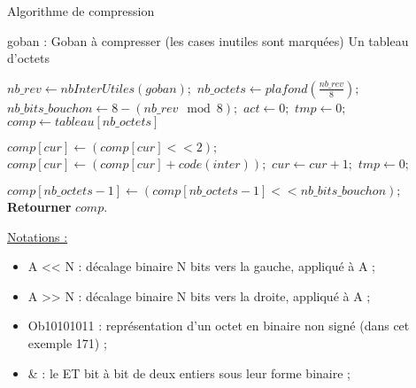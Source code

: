             \begin{algorithm}
                \caption{Algorithme de compression}
                \begin{algorithmic}
                \REQUIRE goban : Goban à compresser (les cases inutiles sont marquées)
                \ENSURE Un tableau d'octets
        
                \STATE $nb\_rev \leftarrow \textit{nbInterUtiles}(goban);$
                \STATE $nb\_octets \leftarrow \textit{plafond}(\frac{nb\_rev}{8});$
                \STATE $nb\_bits\_bouchon \leftarrow 8 - (nb\_rev \mod 8);$
                \STATE $act \leftarrow 0;$
                \STATE $tmp \leftarrow 0;$
                \STATE $comp \leftarrow \textit{tableau}[nb\_octets]$
                
                    \STATE $comp[cur] \leftarrow (comp[cur] << 2);$
                    \STATE $comp[cur] \leftarrow (comp[cur] + \textit{code}(inter));$
                        \STATE $cur \leftarrow cur + 1;$
                        \STATE $tmp \leftarrow 0;$
                    \ENDIF
                \ENDFOR
         
                \STATE $comp[nb\_octets - 1] \leftarrow (comp[nb\_octets - 1] << nb\_bits\_bouchon);$
                \STATE \textbf{Retourner} $comp$.
                \end{algorithmic}
            \end{algorithm}
    
            \begin{framed}
                    \underline{Notations :}
                    \begin{itemize}
                        \item A << N : décalage binaire N bits vers la gauche, appliqué à A ;
                        \item A >> N : décalage binaire N bits vers la droite, appliqué à A ;
                        \item Ob10101011 : représentation d’un octet en binaire non signé (dans cet exemple 171) ;
                        \item \& : le ET bit à bit de deux entiers sous leur forme binaire ;
                    \end{itemize}
                \end{framed}
    
